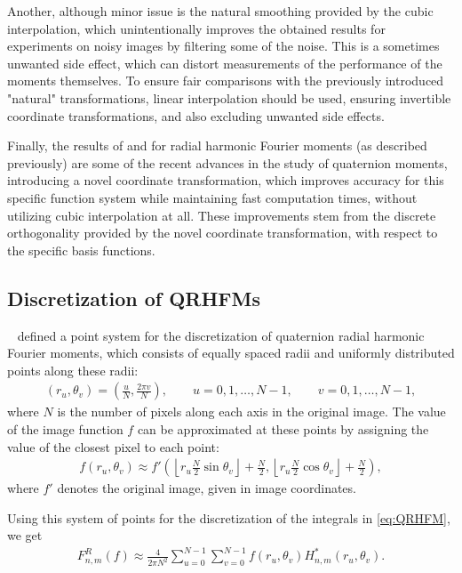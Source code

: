 Another, although minor issue is the natural smoothing provided by the cubic interpolation, which unintentionally improves the obtained results for experiments on noisy images by filtering some of the noise. This is a sometimes unwanted side effect, which can distort measurements of the performance of the moments themselves. To ensure fair comparisons with the previously introduced "natural" transformations, linear interpolation should be used, ensuring invertible coordinate transformations, and also excluding unwanted side effects.


Finally, the results of \citeauthor{WangAcc} \cite{WangAcc} and \citeauthor{LiuAcc} \cite{LiuAcc} for radial harmonic Fourier moments (as described previously) are some of the recent advances in the study of quaternion moments, introducing a novel coordinate transformation, which improves accuracy for this specific function system while maintaining fast computation times, without utilizing cubic interpolation at all. These improvements stem from the discrete orthogonality provided by the novel coordinate transformation, with respect to the specific basis functions.


\subsection{Discretization of QRHFMs}
\citeauthor{LiuAcc}~\cite{LiuAcc} defined a point system for the discretization of quaternion radial harmonic Fourier moments, which consists of equally spaced radii and uniformly distributed points along these radii:
\begin{gather*}
    (r_u, \theta_v) = \left(\frac{u}{N}, \frac{2\pi v}{N}\right), \qquad u = 0,1,\ldots ,N - 1, \qquad v = 0,1,\ldots ,N - 1,
\end{gather*}
where $N$ is the number of pixels along each axis in the original image. The value of the image function $f$ can be approximated at these points by assigning the value of the closest pixel to each point:
\begin{gather} \label{eq:QRHFM_approx}
    f(r_u, \theta_v) \approx f'\left(\left \lfloor r_u\frac{N}{2}\sin \theta_v \right \rfloor + \frac{N}{2}, \left \lfloor r_u\frac{N}{2}\cos \theta_v \right \rfloor + \frac{N}{2}\right),
\end{gather}
where $f'$ denotes the original image, given in image coordinates.


Using this system of points for the discretization of the integrals in \eqref{eq:QRHFM}, we get
\begin{gather*}
    F_{n,m}^R(f) \approx \frac{4}{2\pi N^2}\sum_{u = 0}^{N-1}\sum_{v = 0}^{N-1}f(r_u, \theta_v)H_{n,m}^*(r_u, \theta_v).
\end{gather*}


